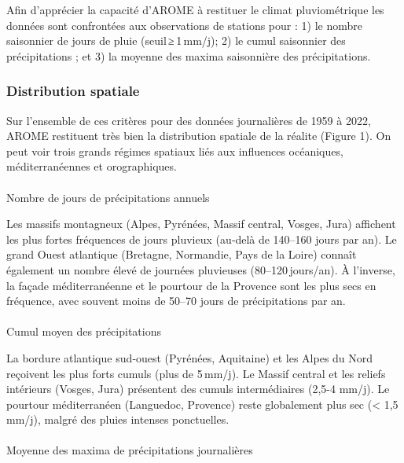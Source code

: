 \documentclass[
  article,
  nofooter,
  noheadings]{jss}
\makeatletter
\let\oldparagraph\paragraph
\renewcommand{\paragraph}{
    \@ifstar
      \xxxParagraphStar
      \xxxParagraphNoStar
  }
\newcommand{\xxxParagraphStar}[1]{\oldparagraph*{#1}\mbox{}}
\newcommand{\xxxParagraphNoStar}[1]{\oldparagraph{#1}\mbox{}}
\makeatother
\begin{document}
Afin d'apprécier la capacité d'AROME à restituer le climat
pluviométrique les données sont confrontées aux observations de stations
pour : 1) le nombre saisonnier de jours de pluie (seuil\,≥\,1\,mm/j); 2)
le cumul saisonnier des précipitations ; et 3) la moyenne des maxima
saisonnière des précipitations.

\subsubsection{Distribution spatiale}\label{distribution-spatiale}

Sur l'ensemble de ces critères pour des données journalières de 1959 à
2022, AROME restituent très bien la distribution spatiale de la réalite
(Figure 1). On peut voir trois grands régimes spatiaux liés aux
influences océaniques, méditerranéennes et orographiques.

\paragraph{Nombre de jours de précipitations
annuels}\label{nombre-de-jours-de-pruxe9cipitations-annuels}

Les massifs montagneux (Alpes, Pyrénées, Massif central, Vosges, Jura)
affichent les plus fortes fréquences de jours pluvieux (au‑delà de
140--160 jours par an). Le grand Ouest atlantique (Bretagne, Normandie,
Pays de la Loire) connaît également un nombre élevé de journées
pluvieuses (80--120\,jours/an). À l'inverse, la façade méditerranéenne
et le pourtour de la Provence sont les plus secs en fréquence, avec
souvent moins de 50--70 jours de précipitations par an.

\paragraph{Cumul moyen des
précipitations}\label{cumul-moyen-des-pruxe9cipitations}

La bordure atlantique sud‑ouest (Pyrénées, Aquitaine) et les Alpes du
Nord reçoivent les plus forts cumuls (plus de 5\,mm/j). Le Massif
central et les reliefs intérieurs (Vosges, Jura) présentent des cumuls
intermédiaires (2,5-4 mm/j). Le pourtour méditerranéen (Languedoc,
Provence) reste globalement plus sec (\textless{} 1,5 mm/j), malgré des
pluies intenses ponctuelles.

\paragraph{Moyenne des maxima de précipitations
journalières}\label{moyenne-des-maxima-de-pruxe9cipitations-journaliuxe8res}
\end{document}
